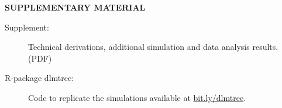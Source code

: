 \documentclass[12pt]{article}
\begin{document}
\bigskip
\begin{center}
{\large\bf SUPPLEMENTARY MATERIAL}
\end{center}
\begin{description}

\item[Supplement:] Technical derivations, additional simulation and data analysis results. (PDF)

\item[R-package dlmtree:] Code to replicate the simulations available at \url{bit.ly/dlmtree}.

\end{description}



\end{document}
